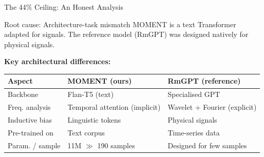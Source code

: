\documentclass{beamer}
\begin{document}
\begin{frame}{The 44\% Ceiling: An Honest Analysis}

    \begin{alertblock}{Root cause: Architecture-task mismatch}
        MOMENT is a text Transformer adapted for signals. The reference model (RmGPT) was designed natively for physical signals.
    \end{alertblock}

    \vspace{0.3cm}
    \textbf{Key architectural differences:}

    \begin{table}[]
        \centering
        \small
        \begin{tabular}{@{}lll@{}}
            \toprule
            \textbf{Aspect} & \textbf{MOMENT (ours)} & \textbf{RmGPT (reference)} \\
            \midrule
            Backbone & Flan-T5 (text) & Specialised GPT \\
            Freq. analysis & Temporal attention (implicit) & Wavelet + Fourier (explicit) \\
            Inductive bias & Linguistic tokens & Physical signals \\
            Pre-trained on & Text corpus & Time-series data \\
            Param. / sample & 11M $\gg$ 190 samples & Designed for few samples \\
            \bottomrule
        \end{tabular}
    \end{table}
\end{frame}
\end{document}
